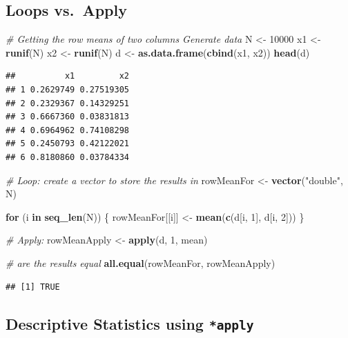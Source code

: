 \documentclass[]{book}
\makeatletter
\newenvironment{Shaded}{\begin{snugshade}}{\end{snugshade}}
\newcommand{\KeywordTok}[1]{\textcolor[rgb]{0.13,0.29,0.53}{\textbf{#1}}}
\newcommand{\DecValTok}[1]{\textcolor[rgb]{0.00,0.00,0.81}{#1}}
\newcommand{\StringTok}[1]{\textcolor[rgb]{0.31,0.60,0.02}{#1}}
\newcommand{\CommentTok}[1]{\textcolor[rgb]{0.56,0.35,0.01}{\textit{#1}}}
\newcommand{\ControlFlowTok}[1]{\textcolor[rgb]{0.13,0.29,0.53}{\textbf{#1}}}
\newcommand{\NormalTok}[1]{#1}
\newenvironment{kframe}{%
\medskip{}
\setlength{\fboxsep}{.8em}
 \def\at@end@of@kframe{}%
 \ifinner\ifhmode%
  \def\at@end@of@kframe{\end{minipage}}%
  \begin{minipage}{\columnwidth}%
 \fi\fi%
 \def\FrameCommand##1{\hskip\@totalleftmargin \hskip-\fboxsep
 \colorbox{shadecolor}{##1}\hskip-\fboxsep
     \hskip-\linewidth \hskip-\@totalleftmargin \hskip\columnwidth}%
 \MakeFramed {\advance\hsize-\width
   \@totalleftmargin\z@ \linewidth\hsize
   \@setminipage}}%
 {\par\unskip\endMakeFramed%
 \at@end@of@kframe}
\renewenvironment{Shaded}{\begin{kframe}}{\end{kframe}}
\theoremstyle{definition}
\theoremstyle{definition}
\theoremstyle{definition}
\theoremstyle{remark}
\makeatother
\begin{document}
\subsection{Loops vs.~Apply}\label{loops-vs.apply}

\begin{Shaded}
\begin{Highlighting}[]
\CommentTok{# Getting the row means of two columns Generate data}
\NormalTok{N <-}\StringTok{ }\DecValTok{10000}
\NormalTok{x1 <-}\StringTok{ }\KeywordTok{runif}\NormalTok{(N)}
\NormalTok{x2 <-}\StringTok{ }\KeywordTok{runif}\NormalTok{(N)}
\NormalTok{d <-}\StringTok{ }\KeywordTok{as.data.frame}\NormalTok{(}\KeywordTok{cbind}\NormalTok{(x1, x2))}
\KeywordTok{head}\NormalTok{(d)}
\end{Highlighting}
\end{Shaded}

\begin{verbatim}
##          x1         x2
## 1 0.2629749 0.27519305
## 2 0.2329367 0.14329251
## 3 0.6667360 0.03831813
## 4 0.6964962 0.74108298
## 5 0.2450793 0.42122021
## 6 0.8180860 0.03784334
\end{verbatim}

\begin{Shaded}
\begin{Highlighting}[]
\CommentTok{# Loop: create a vector to store the results in}
\NormalTok{rowMeanFor <-}\StringTok{ }\KeywordTok{vector}\NormalTok{(}\StringTok{"double"}\NormalTok{, N)}

\ControlFlowTok{for}\NormalTok{ (i }\ControlFlowTok{in} \KeywordTok{seq_len}\NormalTok{(N)) \{}
\NormalTok{    rowMeanFor[[i]] <-}\StringTok{ }\KeywordTok{mean}\NormalTok{(}\KeywordTok{c}\NormalTok{(d[i, }\DecValTok{1}\NormalTok{], d[i, }\DecValTok{2}\NormalTok{]))}
\NormalTok{\}}

\CommentTok{# Apply:}
\NormalTok{rowMeanApply <-}\StringTok{ }\KeywordTok{apply}\NormalTok{(d, }\DecValTok{1}\NormalTok{, mean)}

\CommentTok{# are the results equal}
\KeywordTok{all.equal}\NormalTok{(rowMeanFor, rowMeanApply)}
\end{Highlighting}
\end{Shaded}

\begin{verbatim}
## [1] TRUE
\end{verbatim}

\subsection{\texorpdfstring{Descriptive Statistics using
\texttt{*apply}}{Descriptive Statistics using *apply}}\label{descriptive-statistics-using-apply}
\end{document}
